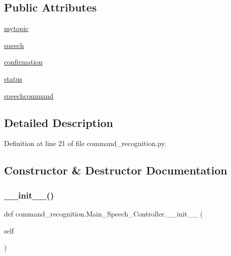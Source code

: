 \subsection*{Public Attributes}
\begin{DoxyCompactItemize}
\item 
\hyperlink{classcommand__recognition_1_1_main___speech___controller_ace8e299f41b4b37fe5e3e060fa03781f}{mytopic}
\item 
\hyperlink{classcommand__recognition_1_1_main___speech___controller_abbf94dd60a0a5244906d8842734eca55}{speech}
\item 
\hyperlink{classcommand__recognition_1_1_main___speech___controller_a8db8cf2f5d84e14336e83ce65fc79584}{confirmation}
\item 
\hyperlink{classcommand__recognition_1_1_main___speech___controller_a7b8c9320db0e9e052e46d7261914aa1f}{status}
\item 
\hyperlink{classcommand__recognition_1_1_main___speech___controller_a382d3bbe539ba93713ad9b4057e2a226}{speechcommand}
\end{DoxyCompactItemize}


\subsection{Detailed Description}


Definition at line 21 of file command\+\_\+recognition.\+py.



\subsection{Constructor \& Destructor Documentation}
\mbox{\label{classcommand__recognition_1_1_main___speech___controller_abfc55f738b24720625190c078d5de151}} 
\subsubsection{\texorpdfstring{\+\_\+\+\_\+init\+\_\+\+\_\+()}{\_\_init\_\_()}}
{\footnotesize\ttfamily def command\+\_\+recognition.\+Main\+\_\+\+Speech\+\_\+\+Controller.\+\_\+\+\_\+init\+\_\+\+\_\+ (\begin{DoxyParamCaption}\item[{}]{self }\end{DoxyParamCaption})}



